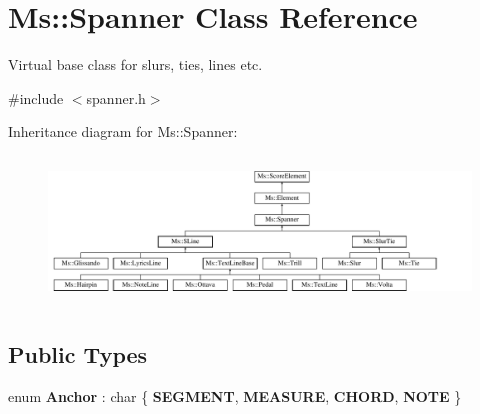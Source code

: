 \hypertarget{class_ms_1_1_spanner}{}\section{Ms\+:\+:Spanner Class Reference}
\label{class_ms_1_1_spanner}


Virtual base class for slurs, ties, lines etc.  




{\ttfamily \#include $<$spanner.\+h$>$}

Inheritance diagram for Ms\+:\+:Spanner\+:\begin{figure}[H]
\begin{center}
\leavevmode
\includegraphics[height=3.966942cm]{class_ms_1_1_spanner}
\end{center}
\end{figure}
\subsection*{Public Types}
\begin{DoxyCompactItemize}
\item 
\mbox{\label{class_ms_1_1_spanner_ad6923689c66a2f0e740eeeec89914b18}} 
enum {\bfseries Anchor} \+: char \{ {\bfseries S\+E\+G\+M\+E\+NT}, 
{\bfseries M\+E\+A\+S\+U\+RE}, 
{\bfseries C\+H\+O\+RD}, 
{\bfseries N\+O\+TE}
 \}
\end{DoxyCompactItemize}
